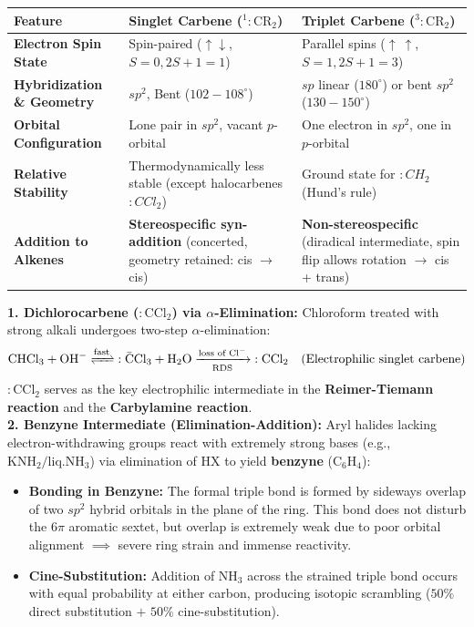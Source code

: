 \documentclass[10pt,a4paper]{article}
\begin{document}
\begin{formulabox}
\begin{tabularx}{\linewidth}{|l|Y|Y|}
\hline
\textbf{Feature} & \textbf{Singlet Carbene ($^1:\mathrm{CR_2}$)} & \textbf{Triplet Carbene ($^3:\mathrm{CR_2}$)} \\
\hline
\textbf{Electron Spin State} & Spin-paired ($\uparrow\downarrow$, $S=0, 2S+1=1$) & Parallel spins ($\uparrow\ \uparrow$, $S=1, 2S+1=3$) \\
\hline
\textbf{Hybridization \& Geometry} & $sp^2$, Bent ($102-108^\circ$) & $sp$ linear ($180^\circ$) or bent $sp^2$ ($130-150^\circ$) \\
\hline
\textbf{Orbital Configuration} & Lone pair in $sp^2$, vacant $p$-orbital & One electron in $sp^2$, one in $p$-orbital \\
\hline
\textbf{Relative Stability} & Thermodynamically less stable (except halocarbenes $:CCl_2$) & Ground state for $:CH_2$ (Hund's rule) \\
\hline
\textbf{Addition to Alkenes} & \textbf{Stereospecific syn-addition} (concerted, geometry retained: cis $\to$ cis) & \textbf{Non-stereospecific} (diradical intermediate, spin flip allows rotation $\to$ cis + trans) \\
\hline
\end{tabularx}
\end{formulabox}

\begin{conceptbox}
\textbf{1. Dichlorocarbene ($:\mathrm{CCl_2}$) via $\alpha$-Elimination:}
Chloroform treated with strong alkali undergoes two-step $\alpha$-elimination:
\begin{equation}
  \mathrm{CHCl_3} + \mathrm{OH^-} \xrightleftharpoons{\text{fast}} \mathrm{:\bar{C}Cl_3} + \mathrm{H_2O} \xrightarrow[\text{RDS}]{\text{loss of } \mathrm{Cl^-}} \mathbf{:\mathrm{CCl_2}} \quad (\text{Electrophilic singlet carbene})
\end{equation}
$:\mathrm{CCl_2}$ serves as the key electrophilic intermediate in the \textbf{Reimer-Tiemann reaction} and the \textbf{Carbylamine reaction}.\\
\textbf{2. Benzyne Intermediate (Elimination-Addition):}
Aryl halides lacking electron-withdrawing groups react with extremely strong bases (e.g., $\mathrm{KNH_2 / liq. NH_3}$) via elimination of $\mathrm{HX}$ to yield \textbf{benzyne} ($\mathrm{C_6H_4}$):
\begin{itemize}
  \item \textbf{Bonding in Benzyne:} The formal triple bond is formed by sideways overlap of two $sp^2$ hybrid orbitals in the plane of the ring. This bond does not disturb the $6\pi$ aromatic sextet, but overlap is extremely weak due to poor orbital alignment $\implies$ severe ring strain and immense reactivity.
  \item \textbf{Cine-Substitution:} Addition of $\mathrm{NH_3}$ across the strained triple bond occurs with equal probability at either carbon, producing isotopic scrambling ($50\%$ direct substitution $+$ $50\%$ cine-substitution).
\end{itemize}
\end{conceptbox}
\end{document}
